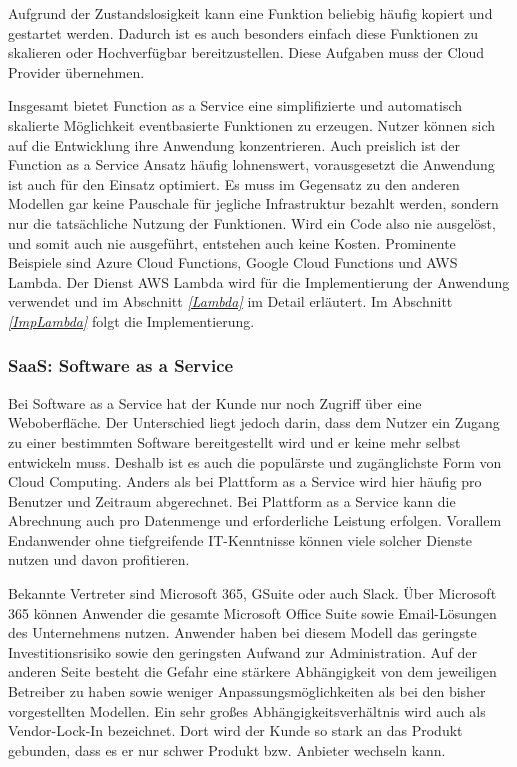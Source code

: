    Aufgrund der Zustandslosigkeit kann eine Funktion beliebig häufig kopiert und gestartet werden.
   Dadurch ist es auch besonders einfach diese Funktionen zu skalieren oder Hochverfügbar bereitzustellen.
   Diese Aufgaben muss der Cloud Provider übernehmen.

   Insgesamt bietet Function as a Service eine simplifizierte und automatisch skalierte Möglichkeit eventbasierte Funktionen zu erzeugen.
   Nutzer können sich auf die Entwicklung ihre Anwendung konzentrieren.
   Auch preislich ist der Function as a Service Ansatz häufig lohnenswert, vorausgesetzt die Anwendung ist auch für den Einsatz optimiert.
   Es muss im Gegensatz zu den anderen Modellen gar keine Pauschale für
   jegliche Infrastruktur bezahlt werden, sondern nur die tatsächliche Nutzung der Funktionen. Wird ein Code also nie ausgelöst, und somit auch nie ausgeführt,
   entstehen auch keine Kosten.
   Prominente Beispiele sind Azure Cloud Functions, Google Cloud Functions und AWS Lambda.
   Der Dienst AWS Lambda wird für die Implementierung der Anwendung verwendet und im Abschnitt \textit{\ref{Lambda} } im Detail erläutert.
   Im Abschnitt \textit{\ref{ImpLambda} } folgt die Implementierung.\cite[]{LambdaZitat}

   \subsubsection{SaaS: Software as a Service}
   Bei Software as a Service hat der Kunde nur noch Zugriff über eine Weboberfläche.
   Der Unterschied liegt jedoch darin, dass dem Nutzer ein Zugang zu einer bestimmten Software bereitgestellt wird und er keine mehr selbst entwickeln muss.
   Deshalb ist es auch die populärste und zugänglichste Form von Cloud Computing.
   Anders als bei Plattform as a Service wird hier häufig pro Benutzer und Zeitraum abgerechnet.
   Bei Plattform as a Service kann die Abrechnung auch pro Datenmenge und erforderliche Leistung erfolgen.
   Vorallem Endanwender ohne tiefgreifende IT-Kenntnisse können viele solcher Dienste nutzen und davon profitieren. \cite[]{SaaS}

   Bekannte Vertreter sind Microsoft 365, GSuite oder auch Slack.
   Über Microsoft 365 können Anwender die gesamte Microsoft Office Suite sowie Email-Lösungen des Unternehmens nutzen.
   Anwender haben bei diesem Modell das geringste Investitionsrisiko sowie den geringsten Aufwand zur Administration.
   Auf der anderen Seite besteht die Gefahr eine stärkere Abhängigkeit von dem jeweiligen Betreiber zu haben sowie weniger Anpassungsmöglichkeiten als bei den bisher vorgestellten Modellen.
   Ein sehr großes Abhängigkeitsverhältnis wird auch als Vendor-Lock-In bezeichnet. Dort wird der Kunde so stark an das Produkt gebunden, dass es er nur schwer Produkt bzw. Anbieter wechseln kann.



